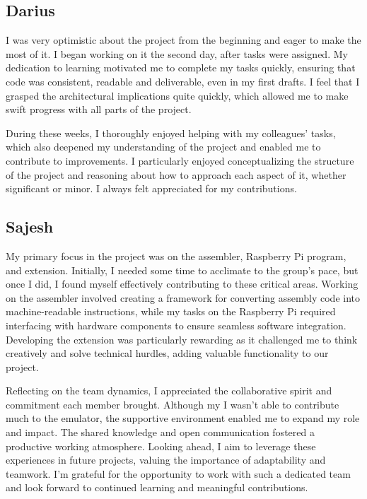 \documentclass{article}
\begin{document}
\subsection{Darius}

I was very optimistic about the project from the beginning and eager to make the most of it. I began working on it the second day, after tasks were assigned. My dedication to learning motivated me to complete my tasks quickly, ensuring that code was consistent, readable and deliverable, even in my first drafts. I feel that I grasped the architectural implications quite quickly, which allowed me to make swift progress with all parts of the project.

During these weeks, I thoroughly enjoyed helping with my colleagues' tasks, which also deepened my understanding of the project and enabled me to contribute to improvements. I particularly enjoyed conceptualizing the structure of the project and reasoning about how to approach each aspect of it, whether significant or minor. I always felt appreciated for my contributions.

\subsection{Sajesh}

My primary focus in the project was on the assembler, Raspberry Pi program, and extension. Initially, I needed some time to acclimate to the group's pace, but once I did, I found myself effectively contributing to these critical areas. Working on the assembler involved creating a framework for converting assembly code into machine-readable instructions, while my tasks on the Raspberry Pi required interfacing with hardware components to ensure seamless software integration. Developing the extension was particularly rewarding as it challenged me to think creatively and solve technical hurdles, adding valuable functionality to our project.

Reflecting on the team dynamics, I appreciated the collaborative spirit and commitment each member brought. Although my I wasn't able to contribute much to the emulator, the supportive environment enabled me to expand my role and impact. The shared knowledge and open communication fostered a productive working atmosphere. Looking ahead, I aim to leverage these experiences in future projects, valuing the importance of adaptability and teamwork. I'm grateful for the opportunity to work with such a dedicated team and look forward to continued learning and meaningful contributions.
\end{document}
